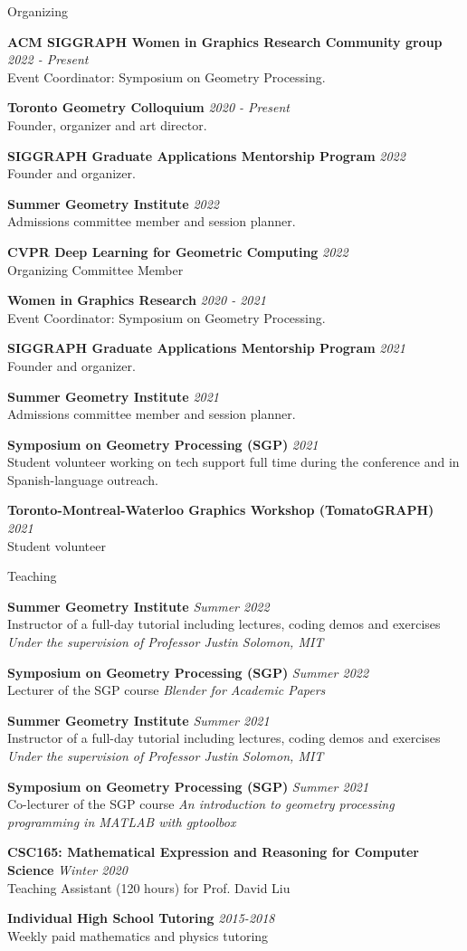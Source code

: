 \documentclass{resume}
\newcommand{\cvitembig}[4]{
    {\bf #1} \hfill {\em \small #2} \\ 
    {\small#3 }\\
    {\it \small #4}
}
\newcommand{\cvitem}[3]{
    {\bf #1} \hfill {\em \small #2} \\ 
    {\small#3 }
}
\begin{document}
\begin{rSection}{Organizing}

\cvitem{ACM SIGGRAPH Women in Graphics Research Community group}{2022 - Present}{Event Coordinator: Symposium on Geometry Processing.}
    
\cvitem{Toronto Geometry Colloquium}{2020 - Present}{Founder, organizer and art director.}

\cvitem{SIGGRAPH Graduate Applications Mentorship Program}{2022} 
{Founder and organizer.}

\cvitem{Summer Geometry Institute}{2022} 
{Admissions committee member and session planner.}

\cvitem{CVPR Deep Learning for Geometric Computing}{2022} 
{Organizing Committee Member}

\cvitem{Women in Graphics Research}{2020 - 2021}{Event Coordinator: Symposium on Geometry Processing.}

\cvitem{SIGGRAPH Graduate Applications Mentorship Program}{2021} 
{Founder and organizer.}

\cvitem{Summer Geometry Institute}{2021} 
{Admissions committee member and session planner.}

\cvitem{Symposium on Geometry Processing (SGP)}{2021} 
{Student volunteer working on tech support full time during the conference and in Spanish-language outreach.}

\cvitem{Toronto-Montreal-Waterloo Graphics Workshop (TomatoGRAPH)}{2021} 
{Student volunteer}





\end{rSection}


\begin{rSection}{Teaching}

\cvitembig{Summer Geometry Institute}{Summer 2022}{Instructor of a full-day tutorial including lectures, coding demos and exercises}{Under the supervision of Professor Justin Solomon, MIT}

\cvitem{Symposium on Geometry Processing (SGP)}{Summer 2022}{Lecturer of the SGP course {\it Blender for Academic Papers}}

\cvitembig{Summer Geometry Institute}{Summer 2021}{Instructor of a full-day tutorial including lectures, coding demos and exercises}{Under the supervision of Professor Justin Solomon, MIT}

\cvitem{Symposium on Geometry Processing (SGP)}{Summer 2021}{Co-lecturer of the SGP course {\it An introduction to geometry processing  programming in MATLAB with gptoolbox}}

\cvitem{CSC165: Mathematical Expression and Reasoning for Computer Science}{Winter 2020}{Teaching Assistant (120 hours) for Prof. David Liu}

\cvitem{Individual High School Tutoring}{2015-2018}{Weekly paid mathematics and physics tutoring}

\end{rSection}
\end{document}
